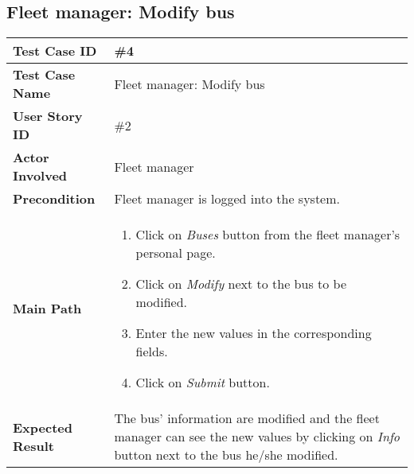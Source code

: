 \subsection{Fleet manager: Modify bus}
\begin{center}
	\begin{tabular} { | m{3.5cm} | m{9.5cm} | }
		\hline
		\textbf{Test Case ID} & \#4\\
		\hline
		\textbf{Test Case Name} & Fleet manager: Modify bus\\
		\hline
		\textbf{User Story ID} & \#2 \\
		\hline
		\textbf{Actor Involved} & Fleet manager\\
		\hline
		\textbf{Precondition} & Fleet manager is logged into the system.\\
		\hline
		\textbf{Main Path} & 
		\begin{enumerate}
			\item Click on \textit{Buses} button from the fleet manager's personal page.
			\item Click on \textit{Modify} next to the bus to be modified.
			\item Enter the new values in the corresponding fields.
			\item Click on \textit{Submit} button.
		\end{enumerate}\\
		\hline
		\textbf{Expected Result} & The bus' information are modified and the fleet manager can see the new values by clicking on \textit{Info} button next to the bus he/she modified.\\
		\hline
	\end{tabular}
\end{center}

